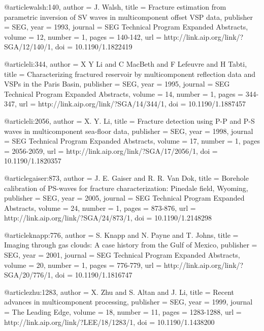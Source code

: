 {@article{walsh:140,
  author =	 {J. Walsh},
  title =	 {Fracture estimation from parametric inversion of
                  {SV} waves in multicomponent offset VSP data},
  publisher =	 {SEG},
  year =	 1993,
  journal =	 {SEG Technical Program Expanded Abstracts},
  volume =	 12,
  number =	 1,
  pages =	 {140-142},
  url =		 {http://link.aip.org/link/?SGA/12/140/1},
  doi =		 {10.1190/1.1822419}
}

@article{li:344,
  author =	 {X Y Li and C MacBeth and F
                  Lefeuvre and H Tabti},
  title =	 {Characterizing fractured reservoir by multicomponent
                  reflection data and {VSP}s in the Paris Basin},
  publisher =	 {SEG},
  year =	 1995,
  journal =	 {SEG Technical Program Expanded Abstracts},
  volume =	 14,
  number =	 1,
  pages =	 {344-347},
  url =		 {http://link.aip.org/link/?SGA/14/344/1},
  doi =		 {10.1190/1.1887457}
}

@article{li:2056,
  author =	 {X. Y. Li},
  title =	 {Fracture detection using {P}-{P} and {P}-{S} waves
                  in multicomponent sea-floor data},
  publisher =	 {SEG},
  year =	 1998,
  journal =	 {SEG Technical Program Expanded Abstracts},
  volume =	 17,
  number =	 1,
  pages =	 {2056-2059},
  url =		 {http://link.aip.org/link/?SGA/17/2056/1},
  doi =		 {10.1190/1.1820357}
}

@article{gaiser:873,
  author =	 {J. E. Gaiser and R. R. Van Dok},
  title =	 {Borehole calibration of PS-waves for fracture
                  characterization: Pinedale field, Wyoming},
  publisher =	 {SEG},
  year =	 2005,
  journal =	 {SEG Technical Program Expanded Abstracts},
  volume =	 24,
  number =	 1,
  pages =	 {873-876},
  url =		 {http://link.aip.org/link/?SGA/24/873/1},
  doi =		 {10.1190/1.2148298}
}

@article{knapp:776,
  author =	 {S. Knapp and N. Payne and T. Johns},
  title =	 {Imaging through gas clouds: A case history from the
                  Gulf of Mexico},
  publisher =	 {SEG},
  year =	 2001,
  journal =	 {SEG Technical Program Expanded Abstracts},
  volume =	 20,
  number =	 1,
  pages =	 {776-779},
  url =		 {http://link.aip.org/link/?SGA/20/776/1},
  doi =		 {10.1190/1.1816747}
}

@article{zhu:1283,
  author =	 {X. Zhu and S. Altan and J. Li},
  title =	 {Recent advances in multicomponent processing},
  publisher =	 {SEG},
  year =	 1999,
  journal =	 {The Leading Edge},
  volume =	 18,
  number =	 11,
  pages =	 {1283-1288},
  url =		 {http://link.aip.org/link/?LEE/18/1283/1},
  doi =		 {10.1190/1.1438200}
}

}
